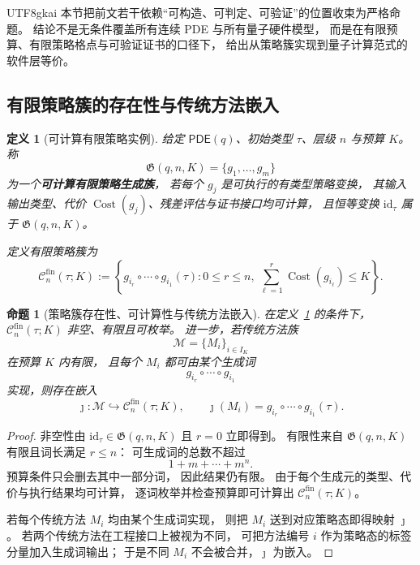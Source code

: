 \documentclass[12pt]{article}
\newtheorem{definition}{定义}[section]
\newtheorem{proposition}{命题}[section]
\newcommand{\PDE}{\mathsf{PDE}}
\newcommand{\Cost}{\operatorname{Cost}}
\newcommand{\id}{\mathrm{id}}
\begin{document}
\begin{CJK*}{UTF8}{gkai}
本节把前文若干依赖“可构造、可判定、可验证”的位置收束为严格命题。
结论不是无条件覆盖所有连续 PDE 与所有量子硬件模型，
而是在有限预算、有限策略格点与可验证证书的口径下，
给出从策略簇实现到量子计算范式的软件层等价。

\subsection{有限策略簇的存在性与传统方法嵌入}
\label{subsec:tex53-finite-cluster-closure}

\begin{definition}[可计算有限策略实例]
\label{def:tex53-computable-instance}
给定 \(\PDE(q)\)、初始类型 \(\tau\)、层级 \(n\) 与预算 \(K\)。
称
\[
  \mathfrak G(q,n,K)
  =
  \{g_1,\ldots,g_m\}
\]
为一个\textbf{可计算有限策略生成族}，
若每个 \(g_j\) 是可执行的有类型策略变换，
其输入输出类型、代价 \(\Cost(g_j)\)、残差评估与证书接口均可计算，
且恒等变换 \(\id_\tau\) 属于 \(\mathfrak G(q,n,K)\)。

定义有限策略簇为
\[
  \mathcal C_n^{\mathrm{fin}}(\tau;K)
  :=
  \left\{
    g_{i_r}\circ\cdots\circ g_{i_1}(\tau):
    0\le r\le n,\
    \sum_{\ell=1}^{r}\Cost(g_{i_\ell})\le K
  \right\}.
\]
\end{definition}

\begin{proposition}[策略簇存在性、可计算性与传统方法嵌入]
\label{prop:tex53-finite-existence-embedding}
在定义~\ref{def:tex53-computable-instance} 的条件下，
\(\mathcal C_n^{\mathrm{fin}}(\tau;K)\) 非空、有限且可枚举。
进一步，若传统方法族
\[
  \mathcal M=\{M_i\}_{i\in I_K}
\]
在预算 \(K\) 内有限，
且每个 \(M_i\) 都可由某个生成词
\[
  g_{i_r}\circ\cdots\circ g_{i_1}
\]
实现，则存在嵌入
\[
  \jmath:\mathcal M\hookrightarrow\mathcal C_n^{\mathrm{fin}}(\tau;K),
  \qquad
  \jmath(M_i)=g_{i_r}\circ\cdots\circ g_{i_1}(\tau).
\]
\end{proposition}

\begin{proof}
非空性由 \(\id_\tau\in\mathfrak G(q,n,K)\) 且 \(r=0\) 立即得到。
有限性来自 \(\mathfrak G(q,n,K)\) 有限且词长满足 \(r\le n\)：
可生成词的总数不超过
\[
  1+m+\cdots+m^n.
\]
预算条件只会删去其中一部分词，
因此结果仍有限。
由于每个生成元的类型、代价与执行结果均可计算，
逐词枚举并检查预算即可计算出 \(\mathcal C_n^{\mathrm{fin}}(\tau;K)\)。

若每个传统方法 \(M_i\) 均由某个生成词实现，
则把 \(M_i\) 送到对应策略态即得映射 \(\jmath\)。
若两个传统方法在工程接口上被视为不同，
可把方法编号 \(i\) 作为策略态的标签分量加入生成词输出；
于是不同 \(M_i\) 不会被合并，\(\jmath\) 为嵌入。
\end{proof}


\end{CJK*}
\end{document}

